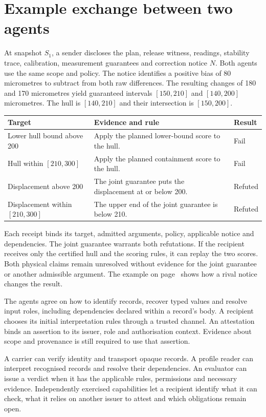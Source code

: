 \documentclass[11pt,a4paper]{article}
\newcommand{\partpage}[1]{\clearpage\section{#1}}
\newcommand{\topic}[1]{\par\smallskip{\sffamily\bfseries\color{ink}#1\par}\nobreak}
\begin{document}
\appendix
\partpage{Example exchange between two agents}\label{app:exchange}
At snapshot $S_1$, a sender discloses the plan, release witness, readings, stability trace, calibration, measurement guarantees and correction notice $N$. Both agents use the same scope and policy. The notice identifies a positive bias of 80 micrometres to subtract from both raw differences. The resulting changes of 180 and 170 micrometres yield guaranteed intervals $[150,210]$ and $[140,200]$ micrometres. The hull is $[140,210]$ and their intersection is $[150,200]$.

\small
\begin{tabularx}{\linewidth}{@{}L{.34\linewidth}YL{.14\linewidth}@{}}
\toprule
\textbf{Target} & \textbf{Evidence and rule} & \textbf{Result} \\ \midrule
Lower hull bound above 200 & Apply the planned lower-bound score to the hull. & Fail \\
Hull within $[210,300]$ & Apply the planned containment score to the hull. & Fail \\
Displacement above 200 & The joint guarantee puts the displacement at or below 200. & Refuted \\
Displacement within $[210,300]$ & The upper end of the joint guarantee is below 210. & Refuted \\
\bottomrule
\end{tabularx}
\normalsize

Each receipt binds its target, admitted arguments, policy, applicable notice and dependencies. The joint guarantee warrants both refutations. If the recipient receives only the certified hull and the scoring rules, it can replay the two scores. Both physical claims remain unresolved without evidence for the joint guarantee or another admissible argument. The example on page~\pageref{sec:rivals} shows how a rival notice changes the result.

\topic{What the recipient needs}
The agents agree on how to identify records, recover typed values and resolve input roles, including dependencies declared within a record's body. A recipient chooses its initial interpretation rules through a trusted channel. An attestation binds an assertion to its issuer, role and authorisation context. Evidence about scope and provenance is still required to use that assertion.

A carrier can verify identity and transport opaque records. A profile reader can interpret recognised records and resolve their dependencies. An evaluator can issue a verdict when it has the applicable rules, permissions and necessary evidence. Independently exercised capabilities let a recipient identify what it can check, what it relies on another issuer to attest and which obligations remain open.
\end{document}
